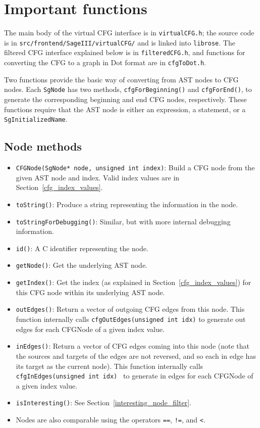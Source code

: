 \section{Important functions}

The main body of the virtual CFG interface is in \lstinline{virtualCFG.h};
the source code is in \lstinline{src/frontend/SageIII/virtualCFG/} and is
linked into \lstinline{librose}.  The filtered CFG interface explained
below is in \lstinline{filteredCFG.h}, and functions for converting the CFG
to a graph in Dot format are in \lstinline{cfgToDot.h}.

Two functions provide the basic way of converting from AST nodes to CFG
nodes.  Each \lstinline{SgNode} has two methods,
\lstinline{cfgForBeginning()} and \lstinline{cfgForEnd()}, to generate the
corresponding beginning and end CFG nodes, respectively.  
These functions require that the AST node is
either an expression, a statement, or a \lstinline{SgInitializedName}.  
\subsection{Node methods}

\begin{itemize}
\item \lstinline{CFGNode(SgNode* node, unsigned int index)}: Build a CFG
node from the given AST node and index.  Valid index values are in
Section~\ref{cfg_index_values}. 
\item \lstinline{toString()}: Produce a string representing the information
in the node.
\item \lstinline{toStringForDebugging()}: Similar, but with more internal
debugging information.
\item \lstinline{id()}: A C identifier representing the node.
\item \lstinline{getNode()}: Get the underlying AST node.
\item \lstinline{getIndex()}: Get the index (as explained in
Section~\ref{cfg_index_values}) for this CFG node within its underlying AST
node.
\item \lstinline{outEdges()}: Return a vector of outgoing CFG edges from
this node. This function internally calls 
\lstinline{cfgOutEdges(unsigned int idx)} to
generate out edges for each CFGNode of a given index value. 
\item \lstinline{inEdges()}: Return a vector of CFG edges coming into this
node (note that the sources and targets of the edges are not reversed, and
so each in edge has its target as the current node). This function
internally calls \lstinline{cfgInEdges(unsigned int idx) } to generate
in edges for each CFGNode of a given index value. 
\item \lstinline{isInteresting()}: See
Section~\ref{interesting_node_filter}.
\item Nodes are also comparable using the operators \lstinline{==},
\lstinline{!=}, and \lstinline{<}.
\end{itemize}

